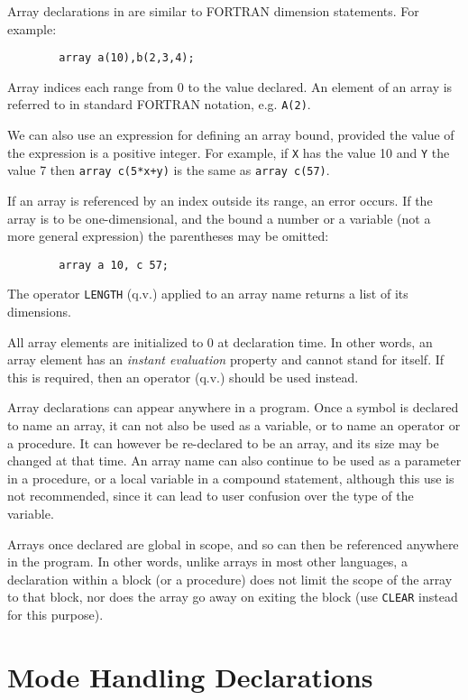 Array declarations in {\REDUCE} are similar to FORTRAN
dimension statements.  For example:
\begin{verbatim}
        array a(10),b(2,3,4);
\end{verbatim}
Array indices each range from 0 to the value declared. An element of an
array is referred to in standard FORTRAN notation, e.g. {\tt A(2)}.

We can also use an expression for defining an array bound, provided the
value of the expression is a positive integer. For example, if {\tt X} has the
value 10 and {\tt Y} the value 7 then
{\tt array c(5*x+y)} is the same as {\tt array c(57)}.

If an array is referenced by an index outside its range, an error occurs.
If the array is to be one-dimensional, and the bound a number or a variable
(not a more general expression) the parentheses may be omitted:
\begin{verbatim}
        array a 10, c 57;
\end{verbatim}
The operator {\tt LENGTH}  (q.v.) applied to an array name
returns a list of its dimensions.

All array elements are initialized to 0 at declaration time. In other words,
an array element has an {\em instant evaluation}
property and cannot stand for itself.  If this is required, then an
operator (q.v.) should be used instead.

Array declarations can appear anywhere in a program. Once a symbol is
declared to name an array, it can not also be used as a variable, or to
name an operator or a procedure. It can however be re-declared to be an
array, and its size may be changed at that time. An array name can also
continue to be used as a parameter in a procedure, or a local variable in
a compound statement, although this use is not recommended, since it can
lead to user confusion over the type of the variable.

Arrays once declared are global in scope, and so can then be referenced
anywhere in the program. In other words, unlike arrays in most other
languages, a declaration within a block (or a procedure) does not limit
the scope of the array to that block, nor does the array go away on
exiting the block (use {\tt CLEAR} instead for this purpose).

\section{Mode Handling Declarations}

